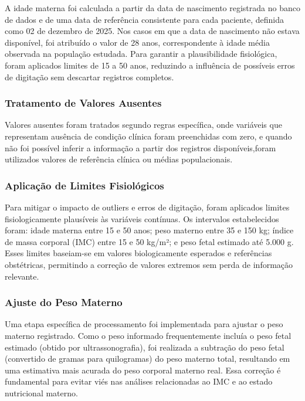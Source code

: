 \documentclass[12pt, a4paper]{report}
\theoremstyle{definition}
\theoremstyle{remark}
\theoremstyle{plain}
\begin{document}
A idade materna foi calculada a partir da data de nascimento registrada no banco de dados e de uma data de referência consistente para cada paciente, definida como 02 de dezembro de 2025. Nos casos em que a data de nascimento não estava disponível, foi atribuído o valor de 28 anos, correspondente à idade média observada na população estudada. Para garantir a plausibilidade fisiológica, foram aplicados limites de 15 a 50 anos, reduzindo a influência de possíveis erros de digitação sem descartar registros completos.

\subsubsection{Tratamento de Valores Ausentes}

Valores ausentes foram tratados segundo regras específica, onde variáveis que representam ausência de condição clínica foram preenchidas com zero, e quando não foi possível inferir a informação a partir dos registros disponíveis,foram utilizados valores de referência clínica ou médias populacionais.

\subsubsection{Aplicação de Limites Fisiológicos}

Para mitigar o impacto de outliers e erros de digitação, foram aplicados limites fisiologicamente plausíveis às variáveis contínuas. Os intervalos estabelecidos foram: idade materna entre 15 e 50 anos; peso materno entre 35 e 150 kg; índice de massa corporal (IMC) entre 15 e 50 kg/m²; e peso fetal estimado até 5.000 g. Esses limites baseiam-se em valores biologicamente esperados e referências obstétricas, permitindo a correção de valores extremos sem perda de informação relevante.

\subsubsection{Ajuste do Peso Materno}

Uma etapa específica de processamento foi implementada para ajustar o peso materno registrado. Como o peso informado frequentemente incluía o peso fetal estimado (obtido por ultrassonografia), foi realizada a subtração do peso fetal (convertido de gramas para quilogramas) do peso materno total, resultando em uma estimativa mais acurada do peso corporal materno real. Essa correção é fundamental para evitar viés nas análises relacionadas ao IMC e ao estado nutricional materno.
\end{document}
